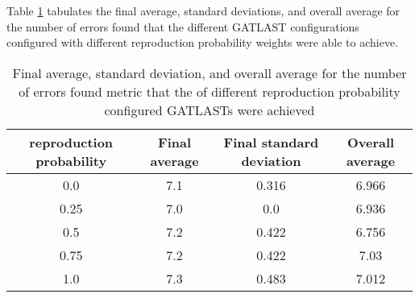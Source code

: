 Table \ref{tab:HP:GA:reproductionProp:number of errors found} tabulates the final average, standard deviations, and overall average for the number of errors found that the different GATLAST configurations configured with different reproduction probability weights were able to achieve.
\begin{table}[tbh!]
\centering
\begin{adjustbox}{trim=0cm 0cm 0cm 0cm, clip=true}
\begin{tabular}{|c|c|c|c|}
\hline
reproduction probability & Final average & Final standard deviation & Overall average\\
\hline
0.0 & 7.1 & 0.316 & 6.966\\\hline
0.25 & 7.0 & 0.0 & 6.936\\\hline
0.5 & 7.2 & 0.422 & 6.756\\\hline
0.75 & 7.2 & 0.422 & 7.03\\\hline
1.0 & 7.3 & 0.483 & 7.012\\\hline
\end{tabular}
\end{adjustbox}
\caption{Final average, standard deviation, and overall average for the number of errors found metric that the of different reproduction probability configured GATLASTs were achieved}
\label{tab:HP:GA:reproductionProp:number of errors found}
\end{table}